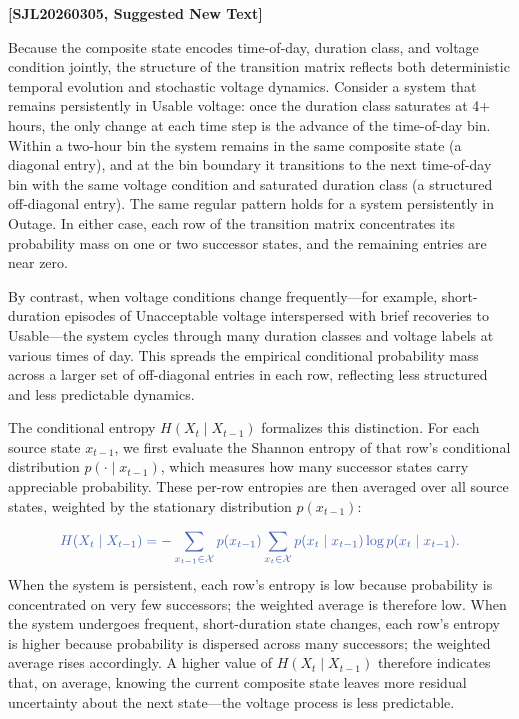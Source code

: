 \documentclass[review]{elsarticle}
\begin{document}
{\color{sjlmutedblue}\textbf{[SJL20260305, Suggested New Text]}}

{\color{sjlmutedblue}Because the composite state encodes time-of-day, duration class, and voltage condition jointly, the structure of the transition matrix reflects both deterministic temporal evolution and stochastic voltage dynamics. Consider a system that remains persistently in Usable voltage: once the duration class saturates at 4+ hours, the only change at each time step is the advance of the time-of-day bin. Within a two-hour bin the system remains in the same composite state (a diagonal entry), and at the bin boundary it transitions to the next time-of-day bin with the same voltage condition and saturated duration class (a structured off-diagonal entry). The same regular pattern holds for a system persistently in Outage. In either case, each row of the transition matrix concentrates its probability mass on one or two successor states, and the remaining entries are near zero.

By contrast, when voltage conditions change frequently---for example, short-duration episodes of Unacceptable voltage interspersed with brief recoveries to Usable---the system cycles through many duration classes and voltage labels at various times of day. This spreads the empirical conditional probability mass across a larger set of off-diagonal entries in each row, reflecting less structured and less predictable dynamics.

The conditional entropy $H(X_t \mid X_{t-1})$ formalizes this distinction. For each source state $x_{t-1}$, we first evaluate the Shannon entropy of that row's conditional distribution $p(\cdot \mid x_{t-1})$, which measures how many successor states carry appreciable probability. These per-row entropies are then averaged over all source states, weighted by the stationary distribution $p(x_{t-1})$:}
\[
\color{sjlmutedblue}
H(X_t \mid X_{t-1}) =
- \sum_{x_{t-1} \in \mathcal{X}} p(x_{t-1})
\sum_{x_t \in \mathcal{X}} p(x_t \mid x_{t-1})
\log p(x_t \mid x_{t-1}).
\]
{\color{sjlmutedblue}When the system is persistent, each row's entropy is low because probability is concentrated on very few successors; the weighted average is therefore low. When the system undergoes frequent, short-duration state changes, each row's entropy is higher because probability is dispersed across many successors; the weighted average rises accordingly. A higher value of $H(X_t \mid X_{t-1})$ therefore indicates that, on average, knowing the current composite state leaves more residual uncertainty about the next state---the voltage process is less predictable.}
\end{document}
